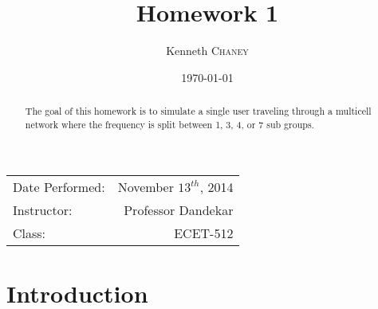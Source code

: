 \documentclass{article}
\title{Homework 1} %
\author{Kenneth \textsc{Chaney}} %
\date{\today} %
\begin{document}
\maketitle %

\begin{center}
\begin{tabular}{l r}
Date Performed: & November \(13^{th}\), 2014 \\ %
Instructor: & Professor Dandekar \\ %
Class: & ECET-512
\end{tabular}
\end{center}

\begin{abstract}
The goal of this homework is to simulate a single user traveling through a multicell network where the frequency is split between 1, 3, 4, or 7 sub groups. 

\end{abstract}

\pagebreak

\section{Introduction}\label{intro}




%
%
%
%

\end{document}
